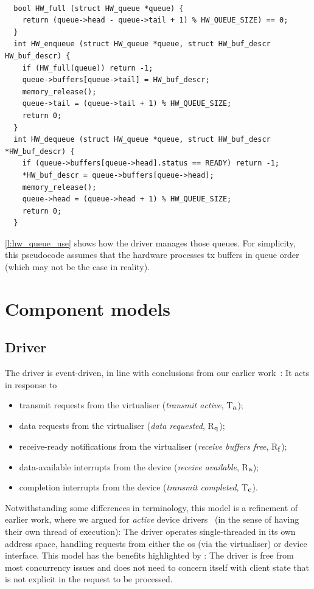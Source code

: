 \documentclass[a4paper,12pt]{report}
\newcommand{\Ra}{R\(_{\mbox{\footnotesize a}}\)\xspace}
\newcommand{\Tc}{T\(_{\mbox{\footnotesize c}}\)\xspace}
\newcommand{\Ta}{T\(_{\mbox{\footnotesize a}}\)\xspace}
\newcommand{\Rq}{R\(_{\mbox{\footnotesize q}}\)\xspace}
\newcommand{\Rf}{R\(_{\mbox{\footnotesize f}}\)\xspace}
\begin{document}
\begin{lstlisting}[gobble=2,firstline=2,float=ht,tabsize=2,label={l:hw_queue_use},
  caption={Device queue management (simplified).}]

  bool HW_full (struct HW_queue *queue) {
    return (queue->head - queue->tail + 1) % HW_QUEUE_SIZE) == 0;
  }
  int HW_enqueue (struct HW_queue *queue, struct HW_buf_descr HW_buf_descr) {
    if (HW_full(queue)) return -1;
    queue->buffers[queue->tail] = HW_buf_descr;
    memory_release();
    queue->tail = (queue->tail + 1) % HW_QUEUE_SIZE;
    return 0;
  }
  int HW_dequeue (struct HW_queue *queue, struct HW_buf_descr *HW_buf_descr) {
    if (queue->buffers[queue->head].status == READY) return -1;
    *HW_buf_descr = queue->buffers[queue->head];
    memory_release();
    queue->head = (queue->head + 1) % HW_QUEUE_SIZE;
    return 0;
  }
\end{lstlisting}

\autoref{l:hw_queue_use} shows how the driver manages those
queues. For simplicity, this pseudocode assumes that the hardware processes \gls{tx} buffers
in queue order (which may not be the case in reality).

\section{Component models}\label{s:models}

\subsection{Driver}\label{s:model_driver}

The driver is event-driven, in line with conclusions
from our earlier work~\citep{Ryzhyk_CKH_09}: It acts in response to
\begin{itemize}
\item transmit requests from the virtualiser (\emph{transmit active},
  \Ta);
\item data requests from the virtualiser (\emph{data requested}, \Rq);
\item receive-ready notifications from the virtualiser (\emph{receive
    buffers free}, \Rf);
\item data-available interrupts from the device (\emph{receive
    available}, \Ra);
\item completion interrupts from the device (\emph{transmit
    completed}, \Tc).
\end{itemize}

Notwithstanding some differences in terminology, this model is a
refinement of earlier work, where we argued for \emph{active} device
drivers~\citep{Ryzhyk_ZH_10} (in the sense of having their own thread
of execution): The driver operates single-threaded in its own
address space, handling requests from either the \gls{os} (via the virtualiser) or device
interface. This model has the benefits
highlighted by \citet{Ryzhyk_ZH_10}: The driver is free
from most concurrency issues and does not need to concern itself with client
state that is not explicit in the request to be processed.
\end{document}
